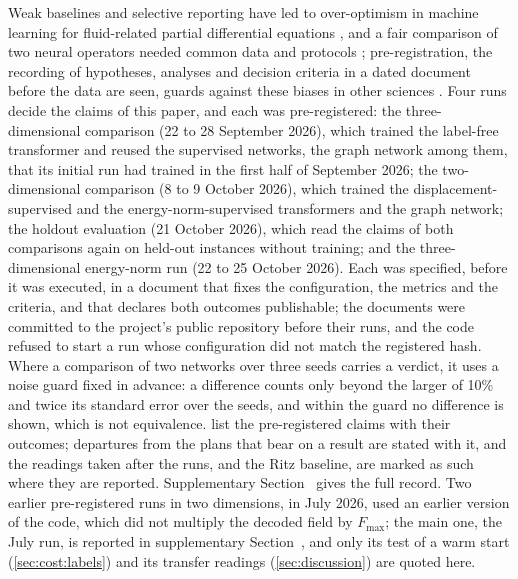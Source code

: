 Weak baselines and selective reporting have led to over-optimism in machine learning for
fluid-related partial differential equations \cite{McGreivy2024}, and a fair comparison of
two neural operators needed common data and protocols \cite{Lu2022Fair}; pre-registration,
the recording of hypotheses, analyses and decision criteria in a dated document before the
data are seen, guards against these biases in other sciences \cite{Nosek2018}. Four runs
decide the claims of this paper, and each was pre-registered: the three-dimensional
comparison (22 to 28 September 2026), which trained the label-free transformer and reused
the supervised networks, the graph network among them, that its initial run had trained in
the first half of September 2026; the two-dimensional comparison (8 to 9 October 2026),
which trained the displacement-supervised and the energy-norm-supervised transformers and
the graph network; the holdout evaluation (21 October 2026), which read the claims of both
comparisons again on held-out instances without training; and the three-dimensional
energy-norm run (22 to 25 October 2026). Each was specified, before it was executed, in a
document that fixes the configuration, the metrics and the criteria, and that declares both
outcomes publishable; the documents were committed to the project's public repository before
their runs, and the code refused to start a run whose configuration did not match the
registered hash. Where a comparison of two networks over three seeds carries a verdict, it
uses a noise guard fixed in advance: a difference counts only beyond the larger of 10\% and
twice its standard error over the seeds, and within the guard no difference is shown, which
is not equivalence.  list the pre-registered claims with their
outcomes; departures from the plans that bear on a result are stated with it, and the
readings taken after the runs, and the Ritz baseline, are marked as such where they are
reported. Supplementary Section~\SuppPrereg{} gives the full record. Two earlier
pre-registered runs in two dimensions, in July 2026, used an earlier version of the code,
which did not multiply the decoded field by $F_{\max}$; the main one, the July run, is
reported in supplementary Section~\SuppJuly{}, and only its test of a warm start
(\cref{sec:cost:labels}) and its transfer readings (\cref{sec:discussion}) are quoted here.

